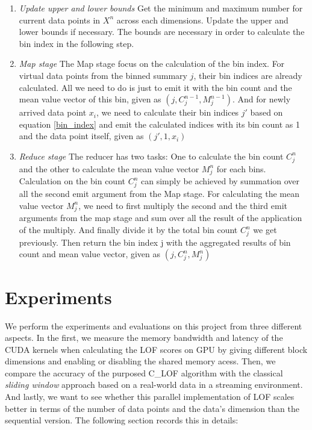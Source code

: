 \documentclass[11pt]{article}       %
\begin{document}
\begin{enumerate}
 \item {\textit{Update upper and lower bounds}}
 	Get the minimum and maximum number for current data points in $X^n$ across each dimensions. Update the upper and lower bounds if necessary. The bounds are necessary in order to calculate the bin index in the following step.
 \item {\textit{Map stage}}
 	The Map stage focus on the calculation of the bin index. For virtual data points from the binned summary $j$, their bin indices are already calculated. All we need to do is just to emit it with the bin count and the mean value vector of this bin, given as $(j, C_j^{n-1}, M_j^{n-1})$. And for newly arrived data point $x_i$, we need to calculate their bin indices $j'$ based on equation \ref{bin_index} and emit the calculated indices with its bin count as 1 and the data point itself, given as ${(j', 1, x_i)}$
\item {\textit{Reduce stage}}
	The reducer has two tasks: One to calculate the bin count $C_j^n$ and the other to calculate the mean value vector $M_j^n$ for each bins. Calculation on the bin count $C_j^n$ can simply be achieved by summation over all the second emit argument from the Map stage. For calculating the mean value vector $M_j^n$, we need to first multiply the second and the third emit arguments from the map stage and sum over all the result of the application of the multiply. And finally divide it by the total bin count $C_j^n$ we get previously. Then return the bin index j with the aggregated results of bin count and mean value vector, given as $(j, C_j^n, M_j^{n})$
\end{enumerate}

\section{Experiments} \label{expert}

We perform the experiments and evaluations on this project from three different aspects. In the first, we measure the memory bandwidth and latency of the CUDA kernels when calculating the LOF scores on GPU by giving different block dimensions and enabling or disabling the shared memory acess. Then, we compare the accuracy of the purposed C\_LOF algorithm with the classical \textit{sliding window} approach based on a real-world data in a streaming environment. And lastly, we want to see whether this parallel implementation of LOF scales better in terms of the number of data points and the data's dimension than the sequential version. The following section records this in details: 
\end{document}
